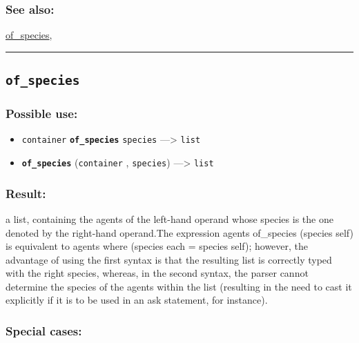 \documentclass[]{book}
\providecommand{\tightlist}{%
  \setlength{\itemsep}{0pt}\setlength{\parskip}{0pt}}
\theoremstyle{definition}
\theoremstyle{definition}
\theoremstyle{definition}
\theoremstyle{remark}
\begin{document}
\subsubsection{See also:}\label{see-also-149}

\href{OperatorsNR\#of_species}{of\_species},

\begin{center}\rule{0.5\linewidth}{\linethickness}\end{center}

\subsection{\texorpdfstring{\texttt{of\_species}}{of\_species}}\label{of_species}

\subsubsection{Possible use:}\label{possible-use-382}

\begin{itemize}
\tightlist
\item
  \texttt{container} \textbf{\texttt{of\_species}} \texttt{species}
  ---\textgreater{} \texttt{list}
\item
  \textbf{\texttt{of\_species}} (\texttt{container} , \texttt{species})
  ---\textgreater{} \texttt{list}
\end{itemize}

\subsubsection{Result:}\label{result-368}

a list, containing the agents of the left-hand operand whose species is
the one denoted by the right-hand operand.The expression agents
of\_species (species self) is equivalent to agents where (species each =
species self); however, the advantage of using the first syntax is that
the resulting list is correctly typed with the right species, whereas,
in the second syntax, the parser cannot determine the species of the
agents within the list (resulting in the need to cast it explicitly if
it is to be used in an ask statement, for instance).

\subsubsection{Special cases:}\label{special-cases-105}
\end{document}
